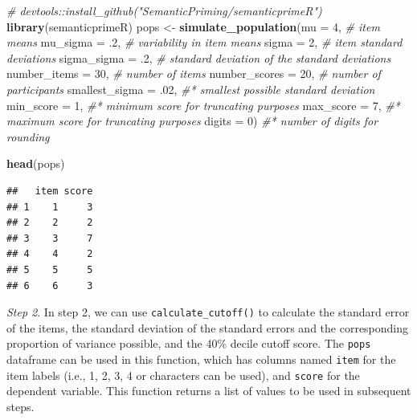 \documentclass[
  man]{apa7}
\newenvironment{Shaded}{\begin{snugshade}}{\end{snugshade}}
\newcommand{\AttributeTok}[1]{\textcolor[rgb]{0.13,0.29,0.53}{#1}}
\newcommand{\CommentTok}[1]{\textcolor[rgb]{0.56,0.35,0.01}{\textit{#1}}}
\newcommand{\DecValTok}[1]{\textcolor[rgb]{0.00,0.00,0.81}{#1}}
\newcommand{\FunctionTok}[1]{\textcolor[rgb]{0.13,0.29,0.53}{\textbf{#1}}}
\newcommand{\NormalTok}[1]{#1}
\newcommand{\OtherTok}[1]{\textcolor[rgb]{0.56,0.35,0.01}{#1}}
\begin{document}
\begin{Shaded}
\begin{Highlighting}[]
\CommentTok{\# devtools::install\_github("SemanticPriming/semanticprimeR")}
\FunctionTok{library}\NormalTok{(semanticprimeR)}
\NormalTok{pops }\OtherTok{\textless{}{-}} \FunctionTok{simulate\_population}\NormalTok{(}\AttributeTok{mu =} \DecValTok{4}\NormalTok{, }\CommentTok{\# item means}
  \AttributeTok{mu\_sigma =}\NormalTok{ .}\DecValTok{2}\NormalTok{, }\CommentTok{\# variability in item means }
  \AttributeTok{sigma =} \DecValTok{2}\NormalTok{, }\CommentTok{\# item standard deviations}
  \AttributeTok{sigma\_sigma =}\NormalTok{ .}\DecValTok{2}\NormalTok{, }\CommentTok{\# standard deviation of the standard deviations}
  \AttributeTok{number\_items =} \DecValTok{30}\NormalTok{, }\CommentTok{\# number of items}
  \AttributeTok{number\_scores =} \DecValTok{20}\NormalTok{, }\CommentTok{\# number of participants}
  \AttributeTok{smallest\_sigma =}\NormalTok{ .}\DecValTok{02}\NormalTok{, }\CommentTok{\#* smallest possible standard deviation}
  \AttributeTok{min\_score =} \DecValTok{1}\NormalTok{, }\CommentTok{\#* minimum score for truncating purposes}
  \AttributeTok{max\_score =} \DecValTok{7}\NormalTok{, }\CommentTok{\#* maximum score for truncating purposes}
  \AttributeTok{digits =} \DecValTok{0}\NormalTok{) }\CommentTok{\#* number of digits for rounding}
  
\FunctionTok{head}\NormalTok{(pops)}
\end{Highlighting}
\end{Shaded}

\begin{verbatim}
##   item score
## 1    1     3
## 2    2     2
## 3    3     7
## 4    4     2
## 5    5     5
## 6    6     3
\end{verbatim}

\emph{Step 2}. In step 2, we can use \texttt{calculate\_cutoff()} to calculate the standard error of the items, the standard deviation of the standard errors and the corresponding proportion of variance possible, and the 40\% decile cutoff score. The \texttt{pops} dataframe can be used in this function, which has columns named \texttt{item} for the item labels (i.e., 1, 2, 3, 4 or characters can be used), and \texttt{score} for the dependent variable. This function returns a list of values to be used in subsequent steps.
\end{document}

